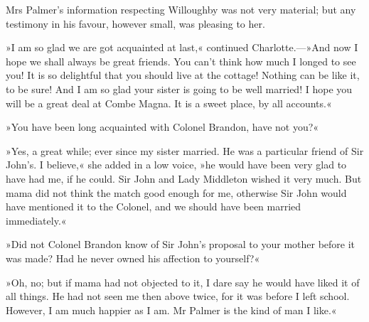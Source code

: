 Mrs Palmer’s information respecting Willoughby was not very material; but any testimony in his favour, however small, was pleasing to her.

»I am so glad we are got acquainted at last,« continued Charlotte.—»And now I hope we shall always be great friends. You can’t think how much I longed to see you! It is so delightful that you should live at the cottage! Nothing can be like it, to be sure! And I am so glad your sister is going to be well married! I hope you will be a great deal at Combe Magna. It is a sweet place, by all accounts.«

»You have been long acquainted with Colonel Brandon, have not you?«

»Yes, a great while; ever since my sister married. He was a particular friend of Sir John’s. I believe,« she added in a low voice, »he would have been very glad to have had me, if he could. Sir John and Lady Middleton wished it very much. But mama did not think the match good enough for me, otherwise Sir John would have mentioned it to the Colonel, and we should have been married immediately.«

»Did not Colonel Brandon know of Sir John’s proposal to your mother before it was made? Had he never owned his affection to yourself?«

»Oh, no; but if mama had not objected to it, I dare say he would have liked it of all things. He had not seen me then above twice, for it was before I left school. However, I am much happier as I am. Mr Palmer is the kind of man I like.«

\begin{letter}
  \enlargethispage{\baselineskip}
\end{letter}